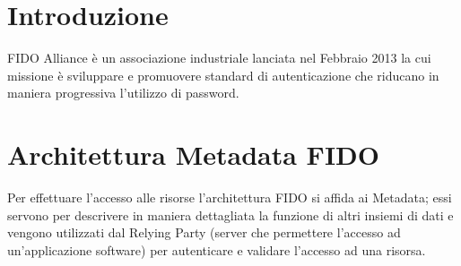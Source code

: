 \section{Introduzione}
FIDO Alliance è un associazione industriale lanciata nel Febbraio 2013 la cui missione è sviluppare e promuovere standard di autenticazione che riducano in maniera progressiva l'utilizzo di password. \\


\section{Architettura Metadata FIDO}
Per effettuare l'accesso alle risorse l'architettura FIDO si affida ai Metadata; essi servono per descrivere in maniera dettagliata la funzione di altri insiemi di dati e vengono utilizzati dal Relying Party (server che permettere l'accesso ad un'applicazione software) per autenticare e validare l'accesso ad una risorsa.\\

